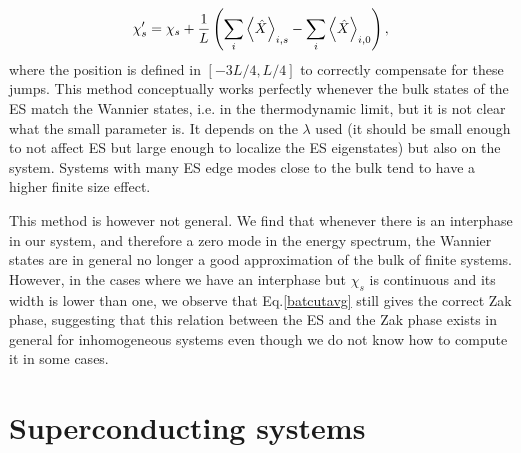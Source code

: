 \documentclass[twocolumn,amsmath,longbibliography,amssymb,superscriptaddress]{revtex4-1}
\begin{document}
\begin{equation}
\chi_s' = \chi_s + \frac{1}{L}\left(\sum_i\expval{\hat{X}}_{i,s}-\sum_i\expval{\hat{X}}_{i,0}\right),
\end{equation}
where the position is defined in $[-3L/4,L/4]$ to correctly compensate for these jumps. This method conceptually works perfectly whenever the bulk states of the ES match the Wannier states, i.e. in the thermodynamic limit, but it is not clear what the small parameter is. It depends on the $\lambda$ used (it should be small enough to not affect ES but large enough to localize the ES eigenstates) but also on the system. Systems with many ES edge modes close to the bulk tend to have a higher finite size effect.

This method is however not general. We find that whenever there is an interphase in our system, and therefore a zero mode in the energy spectrum, the Wannier states are in general no longer a good approximation of the bulk of finite systems. However, in the cases where we have an interphase but $\chi_s$ is continuous and its width is lower than one, we observe that Eq.\eqref{batcutavg} still gives the correct Zak phase, suggesting that this relation between the ES and the Zak phase exists in general for inhomogeneous systems even though we do not know how to compute it in some cases. 



\section{Superconducting systems}
\end{document}
